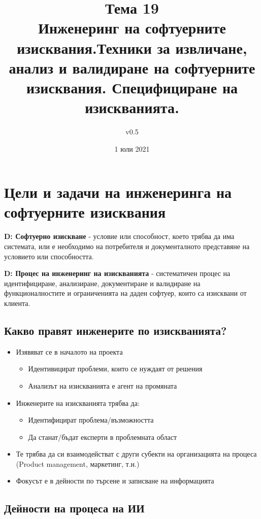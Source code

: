 \documentclass[fleqn,12pt]{article}
\title{Тема 19\\Инженеринг на софтуерните изисквания.Техники за извличане, анализ и валидиране на софтуерните изисквания. Специфициране на изискванията.}
\author{v0.5}
\date{1 юли 2021}
\begin{document}
\maketitle

\tableofcontents

\clearpage

\section{Цели и задачи на инженеринга на софтуерните изисквания}
\textbf{D: Софтуерно изискване} - условие или способност, което трябва да има системата, или е необходимо на потребителя и документалното представяне на условието или способността.

\textbf{D: Процес на инженеринг на изискванията} - систематичен процес на идентифициране, анализиране, документиране и валидиране на функционалностите и ограниченията на даден софтуер, които са изисквани от клиента.

\subsection{Какво правят инженерите по изискванията?}

\begin{itemize}
	\item Изявяват се в началото на проекта
	\begin{itemize}
		\item Идентивицират проблеми, които се нуждаят от решения
		\item Анализът на изискванията е агент на промяната
	\end{itemize}

	\item Инженерите на изискванията трябва да:
	\begin{itemize}
		\item Идентифицират проблема/възможността
		\item Да станат/бъдат експерти в проблемната област
	\end{itemize}

	\item Те трябва да си взаимодействат с други субекти на организацията на процеса (Product management, маркетинг, т.н.)

	\item Фокусът е в дейности по търсене и записване на информацията
\end{itemize}


\subsection{Дейности на процеса на ИИ}
\end{document}
